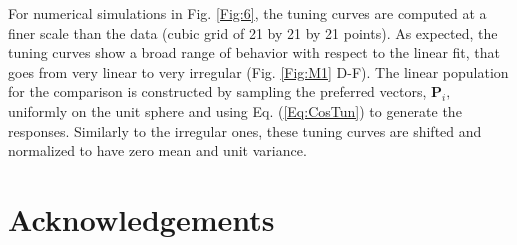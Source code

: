 \documentclass[a4paper]{article}%
\begin{document}
For numerical simulations in Fig. \ref{Fig:6}, the tuning curves are computed
at a finer scale than the data (cubic grid of 21 by 21 by 21 points). As
expected, the tuning curves show a broad range of behavior with respect to the
linear fit, that goes from very linear to very irregular (Fig. \ref{Fig:M1}
D-F). The linear population for the comparison is constructed by sampling the
preferred vectors, $\mathbf{P}_{i}, $  uniformly on the
unit sphere and using Eq. (\ref{Eq:CosTun}) to generate the responses.
Similarly to the irregular ones, these tuning curves are shifted and
normalized to have zero mean and unit variance.

\section{Acknowledgements}
\newpage


%

\end{document}
